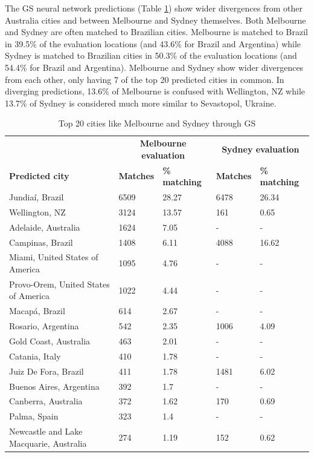 \documentclass[sageh,times]{sagej}
\begin{document}
The GS neural network predictions (Table \ref{tab:melbournesydneyGS}) show wider divergences from other Australia cities and between Melbourne and Sydney themselves. Both Melbourne and Sydney are often matched to Brazilian cities. Melbourne is matched to Brazil in 39.5\% of the evaluation locations (and 43.6\% for Brazil and Argentina) while Sydney is matched to Brazilian cities in 50.3\% of the evaluation locations (and 54.4\% for Brazil and Argentina). Melbourne and Sydney show wider divergences from each other, only having 7 of the top 20 predicted cities in common. In diverging predictions, 13.6\% of Melbourne is confused with Wellington, NZ while 13.7\% of Sydney is considered much more similar to Sevastopol, Ukraine.

\begin{table}[!htbp]
\caption{Top 20 cities like Melbourne and Sydney through GS \label{tab:melbournesydneyGS}}     
\begin{tabular}{ l  l l l  l}
 \hline    &  \multicolumn{2}{c}{\textbf{Melbourne evaluation}} & \multicolumn{2}{c}{\textbf{Sydney evaluation}}  \\  
\textbf{Predicted city} & \textbf{Matches} & \textbf{\% matching}  & \textbf{Matches} & \textbf{\% matching}\\ \hline
Jundia\'{i}, Brazil & 6509 & 28.27 & 6478 & 26.34 \\ 
Wellington, NZ & 3124 & 13.57 & 161 & 0.65 \\ 
Adelaide, Australia & 1624 & 7.05 &-&- \\ 
Campinas, Brazil & 1408 & 6.11 & 4088 & 16.62 \\ 
Miami, United States of America & 1095 & 4.76 &-&- \\ 
Provo-Orem, United States of America & 1022 & 4.44 &-&- \\ 
Macap\'{a}, Brazil & 614 & 2.67 &-&- \\ 
Rosario, Argentina & 542 & 2.35 & 1006 & 4.09 \\ 
Gold Coast, Australia & 463 & 2.01 &-&- \\ 
Catania, Italy & 410 & 1.78 &-&- \\ 
Juiz De Fora, Brazil & 411 & 1.78 & 1481 & 6.02 \\ 
Buenos Aires, Argentina & 392 & 1.7 &-&- \\ 
Canberra, Australia & 372 & 1.62 & 170 & 0.69 \\ 
Palma, Spain & 323 & 1.4 &-&- \\ 
Newcastle and Lake Macquarie, Australia & 274 & 1.19 & 152 & 0.62 \\ 

\end{tabular}
\end{table}
\end{document}
